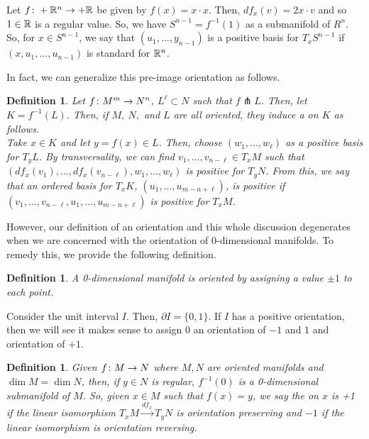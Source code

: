 \documentclass[11pt]{amsbook}
\theoremstyle{mystyle} %
\newtheorem{defi}[thm]{Definition}
\numberwithin{thm}{section}
\renewcommand{\d}{\partial}
\newcommand{\transverse}{\pitchfork}
\begin{document}
\begin{example}
  Let \(f \colon +{\mathbb R}^n \to +{\mathbb R}\) be given by \(f(x) = x \cdot
  x\). Then, \(df_x(v) = 2x \cdot v\) and so \(1 \in {\mathbb R}\) is a regular
  value. So, we have \(S^{n-1} = f^{-1}(1)\) as a submanifold of
  \(R^n\). So, for \(x \in S^{n-1}\), we say that \((u_1, \ldots,
  y_{n-1})\) is a positive basis for \(T_x S^{n-1}\) if \((x, u_1,
  \ldots, u_{n-1})\) is standard for \({\mathbb R}^n\).
\end{example}
In fact, we can generalize this pre-image orientation as follows.
\begin{defi}
  Let \(f \colon M^m \to N^n\), \(L^\ell \subset N\) such that \(f
  \transverse L\). Then, let \(K = f^{-1}(L)\). Then, if \(M,\ N,\)
  and \(L\) are all oriented, they induce a 
  on \(K\) as follows. \\

  Take \(x \in K\) and let \(y = f(x) \in L\). Then, choose \((w_1,
  \ldots, w_\ell)\) as a positive basis for \(T_y L\). By
  transversality, we can find \(v_1, \ldots, v_{n-\ell} \in T_x M\)
  such that \((df_x(v_1), \ldots, df_x(v_{n-\ell}), w_1, \ldots,
  w_\ell)\) is positive for \(T_y N\). From this, we say that an
  ordered basis for \(T_x K\), \((u_1, \ldots, u_{m-n+\ell})\), is
  positive if \((v_1, \ldots, v_{n-\ell}, u_1, \ldots, u_{m-n+\ell})\)
  is positive for \(T_x M\).
\end{defi}
However, our definition of an orientation and this whole discussion
degenerates when we are concerned with
the orientation of 0-dimensional manifolds. To remedy this, we provide
the following definition.
\begin{defi}
  A 0-dimensional manifold is oriented by assigning a value \(\pm 1\)
  to each point.
\end{defi}
\begin{example}
  Consider the unit interval \(I\). Then, \(\d I = \{0,1\}\). If \(I\)
  has a positive orientation, then we will see it makes sense to
  assign \(0\) an orientation of \(-1\) and \(1\) and orientation of
  \(+1\).
\end{example}
\begin{defi}
  Given \(f \colon M \to N\) where \(M,N\) are oriented manifolds and
  \(\dim M = \dim N\), then, if \(y \in N\) is regular, \(f^{-1}(0)\)
  is a 0-dimensional submanifold of \(M\). So, given \(x \in M\) such
  that \(f(x) = y\), we say the  on \(x\) is +1 if the
  linear isomorphism \(T_x M
  \overset{df_x}{\to} T_y N\) is orientation preserving and \(-1\) if
  the linear isomorphism is orientation reversing.
\end{defi}
\end{document}

